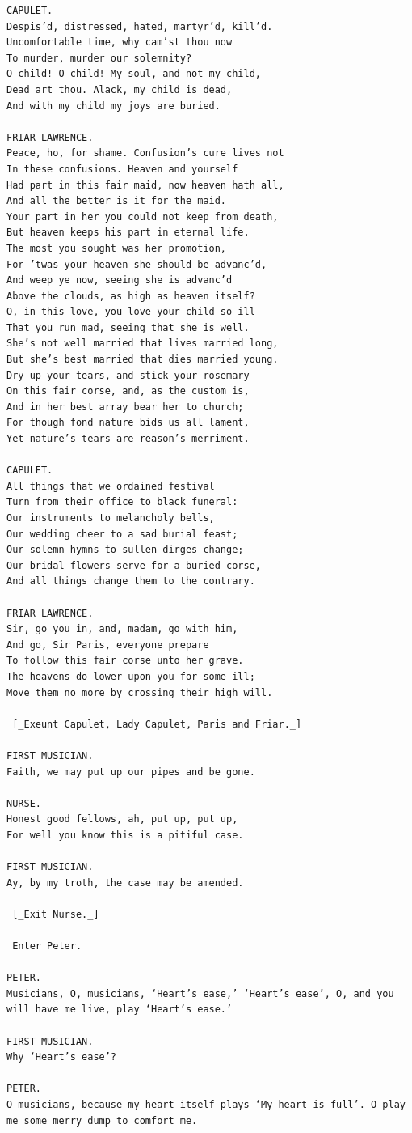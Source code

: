 \documentclass{article}
\begin{document}
\begin{verbatim}
CAPULET.
Despis’d, distressed, hated, martyr’d, kill’d.
Uncomfortable time, why cam’st thou now
To murder, murder our solemnity?
O child! O child! My soul, and not my child,
Dead art thou. Alack, my child is dead,
And with my child my joys are buried.

FRIAR LAWRENCE.
Peace, ho, for shame. Confusion’s cure lives not
In these confusions. Heaven and yourself
Had part in this fair maid, now heaven hath all,
And all the better is it for the maid.
Your part in her you could not keep from death,
But heaven keeps his part in eternal life.
The most you sought was her promotion,
For ’twas your heaven she should be advanc’d,
And weep ye now, seeing she is advanc’d
Above the clouds, as high as heaven itself?
O, in this love, you love your child so ill
That you run mad, seeing that she is well.
She’s not well married that lives married long,
But she’s best married that dies married young.
Dry up your tears, and stick your rosemary
On this fair corse, and, as the custom is,
And in her best array bear her to church;
For though fond nature bids us all lament,
Yet nature’s tears are reason’s merriment.

CAPULET.
All things that we ordained festival
Turn from their office to black funeral:
Our instruments to melancholy bells,
Our wedding cheer to a sad burial feast;
Our solemn hymns to sullen dirges change;
Our bridal flowers serve for a buried corse,
And all things change them to the contrary.

FRIAR LAWRENCE.
Sir, go you in, and, madam, go with him,
And go, Sir Paris, everyone prepare
To follow this fair corse unto her grave.
The heavens do lower upon you for some ill;
Move them no more by crossing their high will.

 [_Exeunt Capulet, Lady Capulet, Paris and Friar._]

FIRST MUSICIAN.
Faith, we may put up our pipes and be gone.

NURSE.
Honest good fellows, ah, put up, put up,
For well you know this is a pitiful case.

FIRST MUSICIAN.
Ay, by my troth, the case may be amended.

 [_Exit Nurse._]

 Enter Peter.

PETER.
Musicians, O, musicians, ‘Heart’s ease,’ ‘Heart’s ease’, O, and you
will have me live, play ‘Heart’s ease.’

FIRST MUSICIAN.
Why ‘Heart’s ease’?

PETER.
O musicians, because my heart itself plays ‘My heart is full’. O play
me some merry dump to comfort me.


\end{verbatim}
\end{document}
